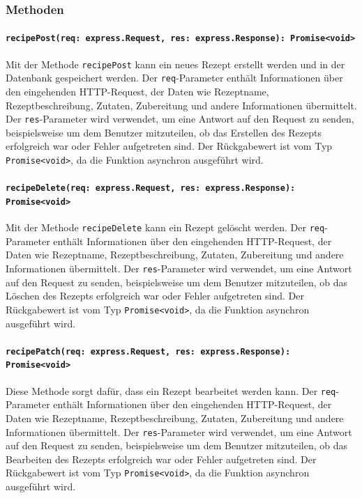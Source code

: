 \documentclass{entwurfsheft}
\begin{document}
\subsubsection*{Methoden}
\paragraph{\texttt{recipePost(req: express.Request, res: express.Response): Promise<void>}}
Mit der Methode \texttt{recipePost} kann ein neues Rezept erstellt werden und in der Datenbank gespeichert werden. Der \texttt{req}-Parameter enthält Informationen über den eingehenden HTTP-Request, der Daten wie Rezeptname, Rezeptbeschreibung, Zutaten, Zubereitung und andere Informationen übermittelt. Der \texttt{res}-Parameter wird verwendet, um eine Antwort auf den Request zu senden, beispielsweise um dem Benutzer mitzuteilen, ob das Erstellen des Rezepts erfolgreich war oder Fehler aufgetreten sind.
Der Rückgabewert ist vom Typ \texttt{Promise<void>}, da die Funktion asynchron ausgeführt wird.
\paragraph{\texttt{recipeDelete(req: express.Request, res: express.Response): Promise<void>}}
Mit der Methode \texttt{recipeDelete} kann ein Rezept gelöscht werden. Der \texttt{req}-Parameter enthält Informationen über den eingehenden HTTP-Request, der Daten wie Rezeptname, Rezeptbeschreibung, Zutaten, Zubereitung und andere Informationen übermittelt. Der \texttt{res}-Parameter wird verwendet, um eine Antwort auf den Request zu senden, beispielsweise um dem Benutzer mitzuteilen, ob das Löschen des Rezepts erfolgreich war oder Fehler aufgetreten sind.
Der Rückgabewert ist vom Typ \texttt{Promise<void>}, da die Funktion asynchron ausgeführt wird.
\paragraph{\texttt{recipePatch(req: express.Request, res: express.Response): Promise<void>}}
Diese Methode sorgt dafür, dass ein Rezept bearbeitet werden kann. Der \texttt{req}-Parameter enthält Informationen über den eingehenden HTTP-Request, der Daten wie Rezeptname, Rezeptbeschreibung, Zutaten, Zubereitung und andere Informationen übermittelt. Der \texttt{res}-Parameter wird verwendet, um eine Antwort auf den Request zu senden, beispielsweise um dem Benutzer mitzuteilen, ob das Bearbeiten des Rezepts erfolgreich war oder Fehler aufgetreten sind.
Der Rückgabewert ist vom Typ \texttt{Promise<void>}, da die Funktion asynchron ausgeführt wird.
\end{document}
